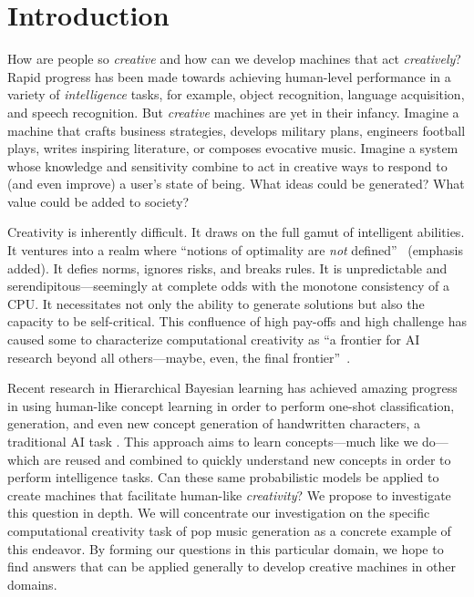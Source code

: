 \documentclass[11pt,phd]{byuprop}
\title{\Title}
\author{\Author}
\begin{document}
\maketitle

\section{Introduction}


How are people so \emph{creative} and how can we develop machines that act \emph{creatively}? Rapid progress has been made towards achieving human-level performance in a variety of \emph{intelligence} tasks, for example, object recognition, language acquisition, and speech recognition. But \emph{creative} machines are yet in their infancy. Imagine a machine that crafts business strategies, develops military plans, engineers football plays, writes inspiring literature, or composes evocative music. Imagine a system whose knowledge and sensitivity combine to act in creative ways to respond to (and even improve) a user's state of being. What ideas could be generated? What value could be added to society?

Creativity is inherently difficult. It draws on the full gamut of intelligent abilities. It ventures into a realm where ``notions of optimality are \emph{not} defined''~\cite{eigenfeldt2012evaluating} (emphasis added). It defies norms, ignores risks, and breaks rules. It is unpredictable and serendipitous---seemingly at complete odds with the monotone consistency of a CPU. It necessitates not only the ability to generate solutions but also the capacity to be self-critical. This confluence of high pay-offs and high challenge has caused some to characterize computational creativity as ``a frontier for AI research beyond all others---maybe, even, the final frontier''~\cite{colton2012computational}. 

Recent research in Hierarchical Bayesian learning has achieved amazing progress in using human-like concept learning in order to perform one-shot classification, generation, and even new concept generation of handwritten characters, a traditional AI task \cite{Lake11122015}. This approach aims to learn concepts---much like we do---which are reused and combined to quickly understand new concepts in order to perform intelligence tasks. Can these same probabilistic models be applied to create machines that facilitate human-like \emph{creativity}? We propose to investigate this question in depth. We will concentrate our investigation on the specific computational creativity task of pop music generation as a concrete example of this endeavor. By forming our questions in this particular domain, we hope to find answers that can be applied generally to develop creative machines in other domains.
\end{document}
